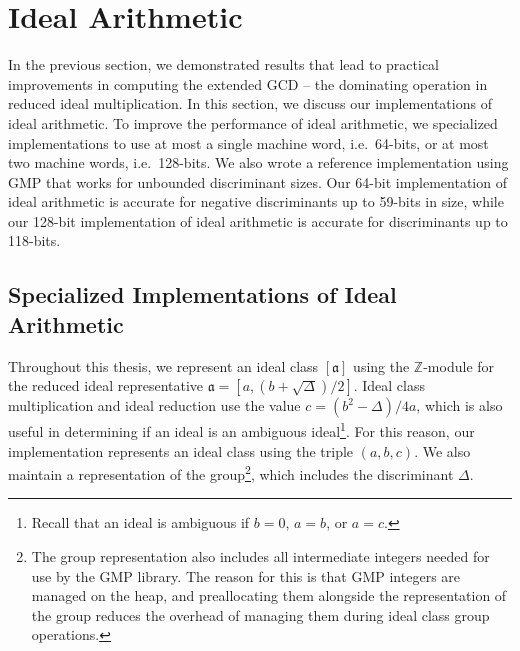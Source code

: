 \documentclass{ucalgthes1}
\theoremstyle{definition}
\newcommand{\ZZ}{\mathbb{Z}}
\begin{document}
\section{Ideal Arithmetic}
\label{sec:idealArithmetic}

In the previous section, we demonstrated results that lead to practical improvements in computing the extended GCD -- the dominating operation in reduced ideal multiplication.  In this section, we discuss our implementations of ideal arithmetic.  To improve the performance of ideal arithmetic, we specialized implementations to use at most a single machine word, i.e.\ 64-bits, or at most two machine words, i.e.\ 128-bits.  We also wrote a reference implementation using GMP that works for unbounded discriminant sizes.  Our 64-bit implementation of ideal arithmetic is accurate for negative discriminants up to 59-bits  in size, while our 128-bit implementation of ideal arithmetic is accurate for discriminants up to 118-bits.

\subsection{Specialized Implementations of Ideal Arithmetic}

Throughout this thesis, we represent an ideal class $[\mathfrak a]$ using the $\ZZ$-module for the reduced ideal representative $\mathfrak a = [a, (b + \sqrt{\Delta})/2]$.  Ideal class multiplication and ideal reduction use the value $c = (b^2 - \Delta)/4a$, which is also useful in determining if an ideal is an ambiguous ideal\footnote{Recall that an ideal is ambiguous if $b=0$, $a=b$, or $a=c$.}.  For this reason, our implementation represents an ideal class using the triple $(a, b, c)$.  We also maintain a representation of the group\footnote{The group representation also includes all intermediate integers needed for use by the GMP library.  The reason for this is that GMP integers are managed on the heap, and preallocating them alongside the representation of the group reduces the overhead of managing them during ideal class group operations.}, which includes the discriminant $\Delta$.
\end{document}
